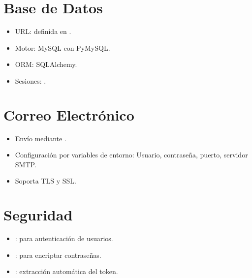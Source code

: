 \documentclass[letterpaper,10pt,spanish]{sphinxmanual}
\begin{document}
\section{Base de Datos}
\label{\detokenize{configuracion:base-de-datos}}\begin{itemize}
\item {} 
\sphinxAtStartPar
URL: definida en .

\item {} 
\sphinxAtStartPar
Motor: MySQL con PyMySQL.

\item {} 
\sphinxAtStartPar
ORM: SQLAlchemy.

\item {} 
\sphinxAtStartPar
Sesiones: .

\end{itemize}


\section{Correo Electrónico}
\label{\detokenize{configuracion:correo-electronico}}\begin{itemize}
\item {} 
\sphinxAtStartPar
Envío mediante .

\item {} 
\sphinxAtStartPar
Configuración por variables de entorno:
\sphinxhyphen{} Usuario, contraseña, puerto, servidor SMTP.

\item {} 
\sphinxAtStartPar
Soporta TLS y SSL.

\end{itemize}


\section{Seguridad}
\label{\detokenize{configuracion:seguridad}}\begin{itemize}
\item {} 
\sphinxAtStartPar
{}: para autenticación de usuarios.

\item {} 
\sphinxAtStartPar
{}: para encriptar contraseñas.

\item {} 
\sphinxAtStartPar
{}: extracción automática del token.

\end{itemize}
\end{document}

